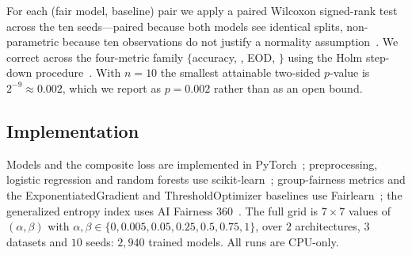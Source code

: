 For each (fair model, baseline) pair we apply a paired Wilcoxon signed-rank
test~\cite{wilcoxon1945individual} across the ten seeds---paired because both
models see identical splits, non-parametric because ten observations do not
justify a normality assumption~\cite{demsar2006statistical}. We correct across
the four-metric family $\{$accuracy, \dpdtwo{}, EOD, \getwo{}$\}$ using the
Holm step-down procedure~\cite{holm1979simple}. With $n=10$ the smallest
attainable two-sided $p$-value is $2^{-9} \approx 0.002$, which we report as
$p = 0.002$ rather than as an open bound.

\subsection{Implementation}

Models and the composite loss are implemented in
PyTorch~\cite{paszke2019pytorch}; preprocessing, logistic regression and
random forests use scikit-learn~\cite{pedregosa2011scikit}; group-fairness
metrics and the ExponentiatedGradient and ThresholdOptimizer baselines use
Fairlearn~\cite{bird2020fairlearn}; the generalized entropy index uses
AI Fairness 360~\cite{bellamy2019ai}. The full grid is
$7 \times 7$ values of $(\alpha,\beta)$ with
$\alpha,\beta \in \{0, 0.005, 0.05, 0.25, 0.5, 0.75, 1\}$, over $2$
architectures, $3$ datasets and $10$ seeds: $2{,}940$ trained models. All runs
are CPU-only.
